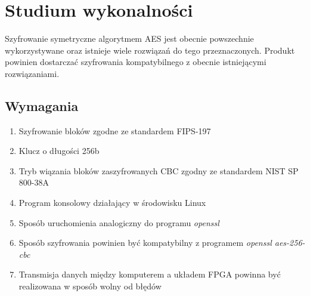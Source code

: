 \section{Studium wykonalności}
\label{sec:studium-wykonalnosci}

Szyfrowanie symetryczne algorytmem AES jest obecnie powszechnie wykorzystywane oraz istnieje wiele rozwiązań do tego przeznaczonych. Produkt powinien dostarczać szyfrowania kompatybilnego z obecnie istniejącymi rozwiązaniami.

\subsection{Wymagania}
\begin{enumerate}
\item Szyfrowanie bloków zgodne ze standardem FIPS-197
\item Klucz o długości 256b
\item Tryb wiązania bloków zaszyfrowanych CBC zgodny ze standardem NIST SP 800-38A
\item Program konsolowy działający w środowisku Linux 
\item Sposób uruchomienia analogiczny do programu \textit{openssl}
\item Sposób szyfrowania powinien być kompatybilny z programem \textit{openssl aes-256-cbc} 
\item Transmisja danych między komputerem a układem FPGA powinna być realizowana w sposób wolny od błędów
\end{enumerate}



\newpage
